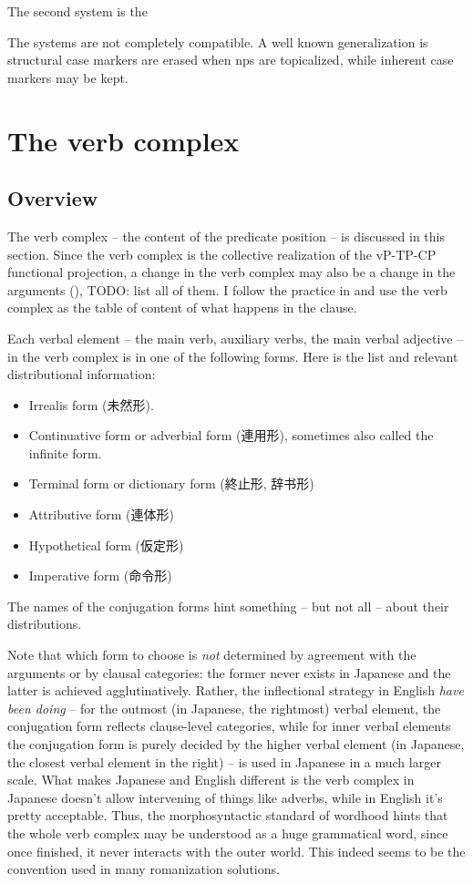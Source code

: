 \documentclass[UTF8, a4paper, oneside, scheme=plain]{ctexart}
\newcommand{\corpus}[1]{\emph{#1}}
\begin{document}
The second system is the 

The systems are not completely compatible.
A well known generalization is structural case markers are erased when \ac{np}s are topicalized,
while inherent case markers may be kept.


\section{The verb complex}

\subsection{Overview}\label{sec:verb-complex-overview}

The verb complex -- the content of the predicate position -- is discussed in this section.
Since the verb complex is the collective realization of the vP-TP-CP functional projection,
a change in the verb complex may also be a change in 
the arguments (),
TODO: list all of them.
I follow the practice in \citet{jacques2021grammar}
and use the verb complex as the table of content of what happens in the clause.

Each verbal element -- the main verb, auxiliary verbs, the main verbal adjective -- 
in the verb complex is in one of the following forms.
Here is the list and relevant distributional information:
\begin{itemize}
    \item Irrealis form (未然形). 
    \item Continuative form or adverbial form (連用形), sometimes also called the infinite form.
    \item Terminal form or dictionary form (終止形, 辞书形)
    \item Attributive form (連体形)
    \item Hypothetical form (仮定形)
    \item Imperative form (命令形)
\end{itemize}
The names of the conjugation forms hint something -- but not all -- about their distributions.

Note that which form to choose is \emph{not} determined by agreement with the arguments 
or by clausal categories:
the former never exists in Japanese and the latter is achieved agglutinatively.
Rather, the inflectional strategy in English \corpus{have been doing} 
-- for the outmost (in Japanese, the rightmost) verbal element,
the conjugation form reflects clause-level categories,
while for inner verbal elements the conjugation form is purely decided 
by the higher verbal element (in Japanese, the closest verbal element in the right) -- 
is used in Japanese in a much larger scale.
What makes Japanese and English different 
is the verb complex in Japanese doesn't allow intervening of things like adverbs,
while in English it's pretty acceptable.
Thus, the morphosyntactic standard of wordhood hints that 
the whole verb complex may be understood as a huge grammatical word,
since once finished, it never interacts with the outer world.
This indeed seems to be the convention used in many romanization solutions.
\end{document}
